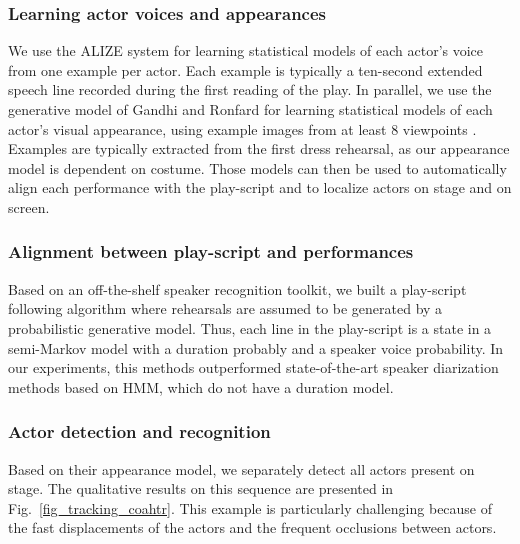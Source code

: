 \documentclass[conference]{IEEEtran}
\begin{document}
\subsubsection{Learning actor  voices and appearances}
We use the ALIZE system for learning statistical models of each actor's voice \cite{Bonastre05}  from one example per actor.
Each example is typically a ten-second extended speech line recorded during the first reading of the play. In parallel,
we use the generative model of Gandhi and Ronfard \cite{Gandhi13} for learning statistical models of each actor's visual appearance, 
using example images from at least 8 viewpoints . Examples are typically extracted from the first dress rehearsal,
as our appearance model is dependent on costume.  Those models can then be used to automatically align
each performance with the play-script and to localize actors on stage and on screen. 

\subsubsection{Alignment between play-script and performances}

Based on an off-the-shelf speaker recognition toolkit, we built a play-script following algorithm where rehearsals 
are assumed to be generated by a probabilistic generative model.  Thus, each  line in the play-script is a state 
in a semi-Markov model with a duration probably and a speaker voice probability. In our experiments, this methods
outperformed state-of-the-art speaker diarization methods based on HMM, which do not have a duration model.



\subsubsection{Actor detection and recognition} 

Based on their appearance model, we separately detect all actors present on stage. The qualitative results on this sequence 
are presented in Fig.~\ref{fig_tracking_coahtr}. This example is particularly challenging  because of the fast displacements 
of the actors and the frequent occlusions between actors. 
\end{document}
